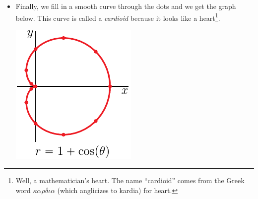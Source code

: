 \begin{eg}
\begin{itemize}
\item
Finally, we fill in a smooth curve through the dots and we get the
graph below. This curve is called a \emph{cardioid} because it looks
like a heart\footnote{Well, a mathematician's heart. The name ``cardioid''
comes from the Greek word $\kappa \alpha \rho \delta \iota \alpha$
(which anglicizes to kardia) for heart.}.
\begin{efig}
\begin{center}
    \includegraphics{cardiodF.pdf}
\end{center}
\end{efig}
\end{itemize}
\end{eg}


